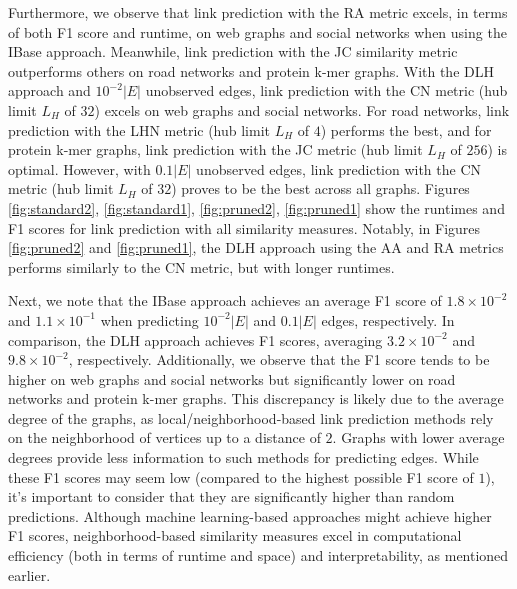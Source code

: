 Furthermore, we observe that link prediction with the RA metric excels, in terms of both F1 score and runtime, on web graphs and social networks when using the IBase approach. Meanwhile, link prediction with the JC similarity metric outperforms others on road networks and protein k-mer graphs. With the DLH approach and $10^{-2}|E|$ unobserved edges, link prediction with the CN metric (hub limit $L_H$ of $32$) excels on web graphs and social networks. For road networks, link prediction with the LHN metric (hub limit $L_H$ of $4$) performs the best, and for protein k-mer graphs, link prediction with the JC metric (hub limit $L_H$ of $256$) is optimal. However, with $0.1|E|$ unobserved edges, link prediction with the CN metric (hub limit $L_H$ of $32$) proves to be the best across all graphs. Figures \ref{fig:standard2}, \ref{fig:standard1}, \ref{fig:pruned2}, \ref{fig:pruned1} show the runtimes and F1 scores for link prediction with all similarity measures. Notably, in Figures \ref{fig:pruned2} and \ref{fig:pruned1}, the DLH approach using the AA and RA metrics performs similarly to the CN metric, but with longer runtimes.

Next, we note that the IBase approach achieves an average F1 score of $1.8\times10^{-2}$ and $1.1\times10^{-1}$ when predicting $10^{-2}|E|$ and $0.1|E|$ edges, respectively. In comparison, the DLH approach achieves F1 scores, averaging $3.2\times10^{-2}$ and $9.8\times10^{-2}$, respectively. Additionally, we observe that the F1 score tends to be higher on web graphs and social networks but significantly lower on road networks and protein k-mer graphs. This discrepancy is likely due to the average degree of the graphs, as local/neighborhood-based link prediction methods rely on the neighborhood of vertices up to a distance of $2$. Graphs with lower average degrees provide less information to such methods for predicting edges. While these F1 scores may seem low (compared to the highest possible F1 score of $1$), it's important to consider that they are significantly higher than random predictions. Although machine learning-based approaches might achieve higher F1 scores, neighborhood-based similarity measures excel in computational efficiency (both in terms of runtime and space) and interpretability, as mentioned earlier.





